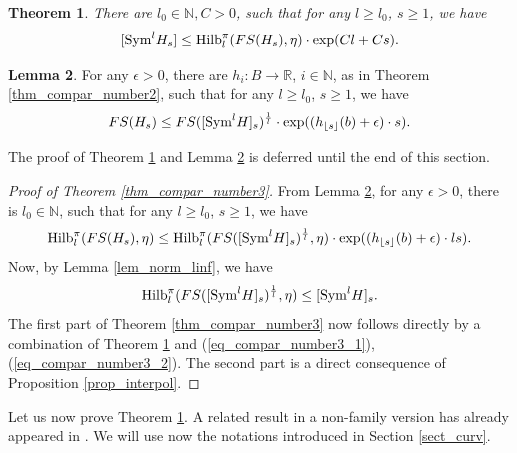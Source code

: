 \documentclass[12pt]{article}
\numberwithin{equation}{section}
\theoremstyle{theorem}
\newtheorem{thm}{Theorem}[section]
\theoremstyle{definition}
\newtheorem{lem}[thm]{Lemma}
\theoremstyle{remark}
\newcommand{\real}{\mathbb{R}}
\newcommand{\nat}{\mathbb{N}}
\begin{document}
	\begin{thm}\label{thm_ot_numb_comp}
		There are $l_0 \in \nat, C > 0$, such that for any $l \geq l_0$, $s \geq 1$, we have
		\begin{equation}\label{eq_ot_numb_comp}
			[{\rm{Sym}}^l H_s]
			\leq 
			{\rm{Hilb}}_{l}^{\pi}(FS(H_s), \eta)
			\cdot
			\exp(Cl + Cs).
		\end{equation}
	\end{thm}
	\begin{lem}\label{thm_fs_numb_comp}
		For any $\epsilon > 0$, there are $h_i : B \to \real$, $i \in \nat$, as in Theorem \ref{thm_compar_number2}, such that for any $l \geq l_0$, $s \geq 1$, we have
		\begin{equation}
			FS(H_s)
			\leq 
			FS([{\rm{Sym}}^l H]_s)^{\frac{1}{l}}
			\cdot
			\exp(( h_{\lfloor s \rfloor}(b) + \epsilon ) \cdot s).
		\end{equation}
	\end{lem}
	The proof of Theorem \ref{thm_ot_numb_comp} and Lemma \ref{thm_fs_numb_comp} is deferred until the end of this section.
	\begin{sloppypar}
	\begin{proof}[Proof of Theorem \ref{thm_compar_number3}]
		From Lemma \ref{thm_fs_numb_comp}, for any $\epsilon > 0$, there is $l_0 \in \nat$, such that for any $l \geq l_0$, $s \geq 1$, we have
		\begin{equation}\label{eq_compar_number3_1}
			{\rm{Hilb}}_{l}^{\pi}(FS(H_s), \eta)
			\leq 
			{\rm{Hilb}}_{l}^{\pi}(FS([{\rm{Sym}}^l H]_s)^{\frac{1}{l}}, \eta)
			\cdot
			\exp( ( h_{\lfloor s \rfloor}(b) + \epsilon) \cdot ls).
		\end{equation}
		Now, by Lemma \ref{lem_norm_linf}, we have 
		\begin{equation}\label{eq_compar_number3_2}
			{\rm{Hilb}}_{l}^{\pi}(FS([{\rm{Sym}}^l H]_s)^{\frac{1}{l}}, \eta)
			\leq
			[{\rm{Sym}}^l H]_s.
		\end{equation}
		The first part of Theorem \ref{thm_compar_number3} now follows directly by a combination of Theorem \ref{thm_ot_numb_comp} and (\ref{eq_compar_number3_1}), (\ref{eq_compar_number3_2}).
		The second part is a direct consequence of Proposition \ref{prop_interpol}.
	\end{proof}
	\end{sloppypar}
	\par
	Let us now prove Theorem \ref{thm_ot_numb_comp}.
	A related result in a non-family version has already appeared in \cite[Theorem 4.5]{FinTits}.
	We will use now the notations introduced in Section \ref{sect_curv}.
\end{document}
